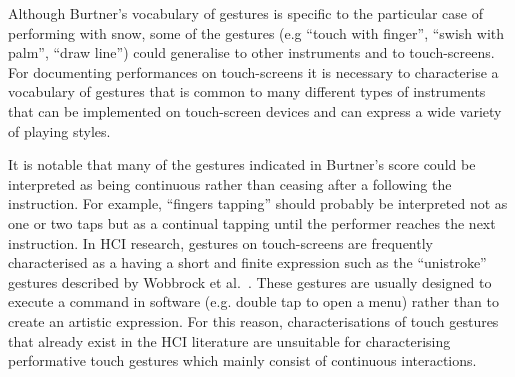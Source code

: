 \documentclass[graybox]{svmult}
\begin{document}

Although Burtner's vocabulary of gestures is specific to the
particular case of performing with snow, some of the gestures (e.g
``touch with finger'', ``swish with palm'', ``draw line'') could
generalise to other instruments and to touch-screens. For documenting
performances on touch-screens it is necessary to characterise a
vocabulary of gestures that is common to many different types of
instruments that can be implemented on touch-screen devices and can
express a wide variety of playing styles.

It is notable that many of the gestures indicated in Burtner's score
could be interpreted as being continuous rather than ceasing after a
following the instruction. For example, ``fingers tapping'' should
probably be interpreted not as one or two taps but as a continual
tapping until the performer reaches the next instruction. In HCI
research, gestures on touch-screens are frequently characterised as a
having a short and finite expression such as the ``unistroke''
gestures described by Wobbrock et al.~\cite{Wobbrock:2007kq}. These
gestures are usually designed to execute a command in software (e.g.
double tap to open a menu) rather than to create an artistic
expression. For this reason, characterisations of touch gestures that
already exist in the HCI literature are unsuitable for characterising
performative touch gestures which mainly consist of continuous
interactions.
\end{document}
